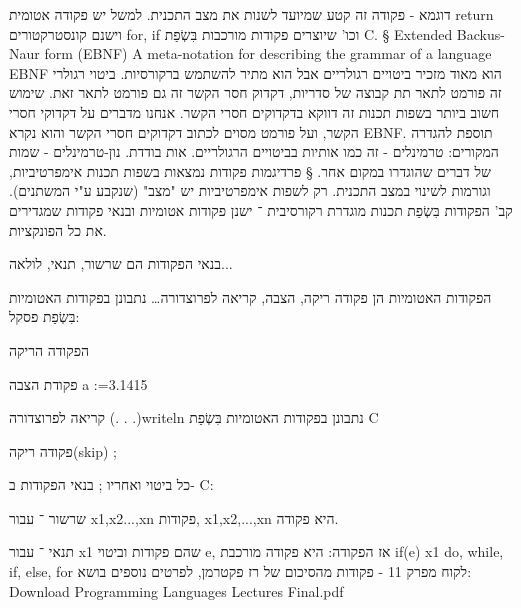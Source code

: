 \begin{טבלא}[!htbp]
        דוגמא - פקודה זה קטע שמיועד לשנות את מצב התכנית.
        למשל יש פקודה אטומית return וישנם קונסטרקטורים for, if וכו' שיוצרים פקודות מורכבות בִּשְׂפַת C.
§ Extended Backus-Naur form (EBNF)
        A meta-notation for describing the grammar of a language
        EBNF הוא מאוד מזכיר ביטויים רגולריים אבל הוא מתיר להשתמש ברקורסיות.
        ביטוי רגולרי זה פורמט לתאר תת קבוצה של סדריות, דקדוק חסר הקשר זה גם פורמט לתאר זאת. שימוש חשוב ביותר בשפות תכנות זה דווקא בדקדוקים חסרי הקשר.
        אנחנו מדברים על דקדוקי חסרי הקשר, ועל פורמט מסוים לכתוב דקדוקים חסרי הקשר והוא נקרא EBNF. תוספת להגדרה המקורים:
        טרמינלים - זה כמו אותיות בביטויים הרגולריים. אות בודדת.
        נון-טרמינלים - שמות של דברים שהוגדרו במקום אחר.
§ פרדיגמות
        פקודות נמצאות בשפות תכנות אימפרטיביות, וגורמות לשינוי במצב התכנית.
        רק לשפות אימפרטיביות יש "מצב" (שנקבע ע"י המשתנים).
        קב' הפקודות בִּשְׂפַת תכנות מוגדרת רקורסיבית ־
        ישנן פקודות אטומיות ובנאי פקודות שמגדירים את כל הפונקציות.
          \item בנאי הפקודות הם שרשור, תנאי, לולאה...
          \item הפקודות האטומיות הן פקודה ריקה, הצבה, קריאה לפרוצדורה…
          נתבונן בפקודות האטומיות בִּשְׂפַת פסקל:
          \item הפקודה הריקה
          \item פקודת הצבה a :=3.1415
          \item קריאה לפרוצדורה (. . .)writeln
          נתבונן בפקודות האטומיות בִּשְׂפַת C
          \item פקודה ריקה(skip) ;
          \item כל ביטוי ואחריו ;
          בנאי הפקודות ב- C:
          \item שרשור ־ עבור x1,x2...,xn פקודות, {x1,x2,...,xn} היא פקודה.
          \item תנאי ־ עבור x1 שהם פקודות וביטוי e, אז הפקודה:
          היא פקודה מורכבת if(e){ x1}
          do, while, if, else, for
          לקוח מפרק 11 - פקודות מהסיכום של רז פקטרמן, לפרטים נוספים בושא:
          Download Programming Languages Lectures Final.pdf


\end{טבלא}
